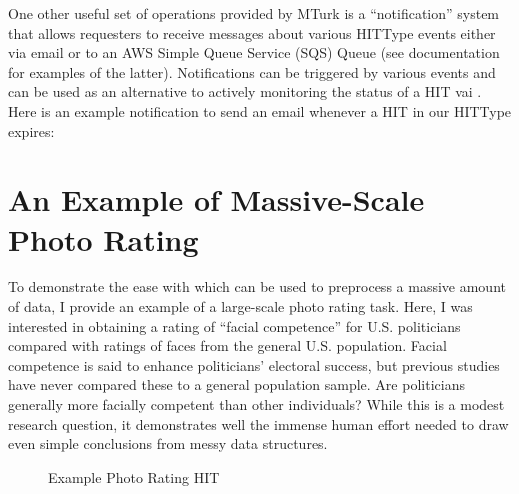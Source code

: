 One other useful set of operations provided by MTurk is a ``notification'' system that allows requesters to receive messages about various HITType events either via email or to an AWS Simple Queue Service (SQS) Queue (see  documentation for examples of the latter). Notifications can be triggered by various events and can be used as an alternative to actively monitoring the status of a HIT vai . Here is an example notification to send an email whenever a HIT in our HITType expires:



\section{An Example of Massive-Scale Photo Rating}

To demonstrate the ease with which  can be used to preprocess a massive amount of data, I provide an example of a large-scale photo rating task. Here, I was interested in obtaining a rating of ``facial competence'' for U.S. politicians compared with ratings of faces from the general U.S. population. Facial competence is said to enhance politicians' electoral success, but previous studies have never compared these to a general population sample. Are politicians generally more facially competent than other individuals? While this is a modest research question, it demonstrates well the immense human effort needed to draw even simple conclusions from messy data structures.

\begin{figure}
\begin{center}
\end{center}
\caption{Example Photo Rating HIT}\label{fig:hit2}
\end{figure}

